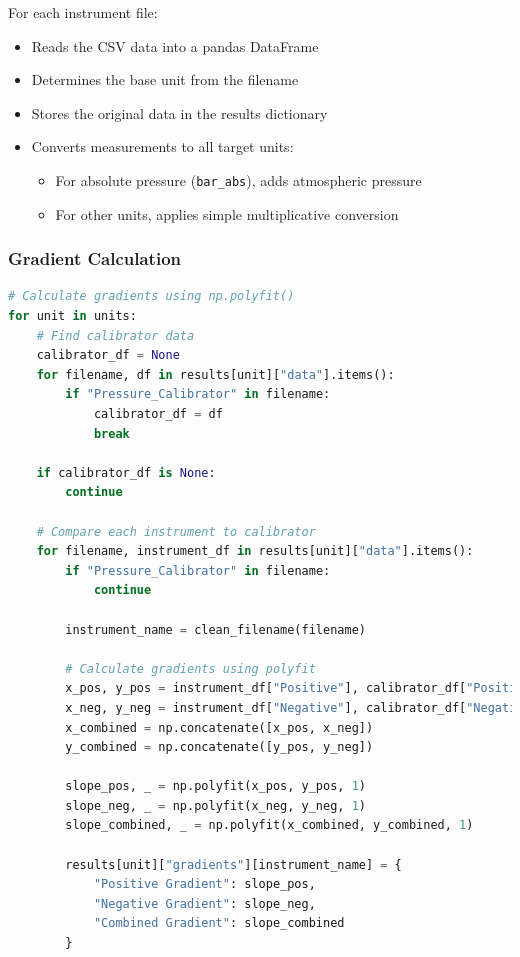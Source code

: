 \documentclass{article}
\begin{document}
For each instrument file:
\begin{itemize}[itemsep=-1mm]
	\item Reads the CSV data into a pandas DataFrame
	\item Determines the base unit from the filename
	\item Stores the original data in the results dictionary
	\item Converts measurements to all target units:
	\begin{itemize}
		\item For absolute pressure (\texttt{bar\_abs}), adds atmospheric pressure
		\item For other units, applies simple multiplicative conversion
	\end{itemize}
\end{itemize}

\subsubsection{Gradient Calculation}
\begin{lstlisting}[language=Python,escapechar=@]
# Calculate gradients using np.polyfit()
for unit in units:
	# Find calibrator data
	calibrator_df = None
	for filename, df in results[unit]["data"].items():
		if "Pressure_Calibrator" in filename:
			calibrator_df = df
			break

	if calibrator_df is None:
		continue

	# Compare each instrument to calibrator
	for filename, instrument_df in results[unit]["data"].items():
		if "Pressure_Calibrator" in filename:
			continue
	
		instrument_name = clean_filename(filename)

		# Calculate gradients using polyfit
		x_pos, y_pos = instrument_df["Positive"], calibrator_df["Positive"]
		x_neg, y_neg = instrument_df["Negative"], calibrator_df["Negative"]
		x_combined = np.concatenate([x_pos, x_neg])
		y_combined = np.concatenate([y_pos, y_neg])
		
		slope_pos, _ = np.polyfit(x_pos, y_pos, 1)
		slope_neg, _ = np.polyfit(x_neg, y_neg, 1)
		slope_combined, _ = np.polyfit(x_combined, y_combined, 1)
		
		results[unit]["gradients"][instrument_name] = {
			"Positive Gradient": slope_pos,
			"Negative Gradient": slope_neg,
			"Combined Gradient": slope_combined
		}
\end{lstlisting}
\end{document}
